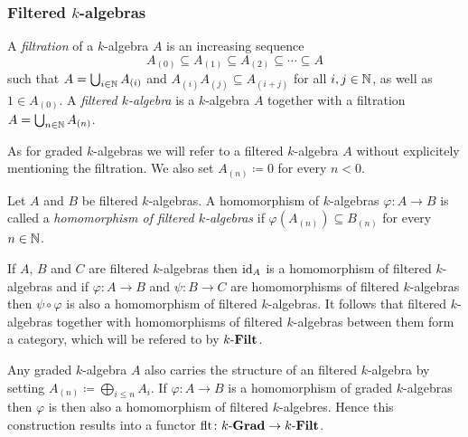 \subsubsection{Filtered $k$-algebras}


\begin{defi}
 A \emph{filtration} of a $k$-algebra $A$ is an increasing sequence
 \[
  A_{(0)}
  \subseteq A_{(1)}
  \subseteq A_{(2)}
  \subseteq \dotsb
  \subseteq A
 \]
 such that $A = \bigcup_{i \in \mathbb{N}} A_{(i)}$ and $A_{(i)} A_{(j)} \subseteq A_{(i+j)}$ for all $i,j \in \mathbb{N}$, as well as $1 \in A_{(0)}$. A \emph{filtered $k$-algebra} is a $k$-algebra $A$ together with a filtration $A = \bigcup_{n \in \mathbb{N}} A_{(n)}$.
\end{defi}


\begin{rem}
 As for graded $k$-algebras we will refer to a filtered $k$-algebra $A$ without explicitely mentioning the filtration. We also set $A_{(n)} \coloneqq 0$ for every $n < 0$.
\end{rem}


\begin{defi}
 Let $A$ and $B$ be filtered $k$-algebras. A homomorphism of $k$-algebras $\varphi \colon A \to B$ is called a \emph{homomorphism of filtered $k$-algebras} if $\varphi(A_{(n)}) \subseteq B_{(n)}$ for every $n \in \mathbb{N}$.
\end{defi}


\begin{rem}
 If $A$, $B$ and $C$ are filtered $k$-algebras then $\operatorname{id}_A$ is a homomorphism of filtered $k$-algebras and if $\varphi \colon A \to B$ and $\psi \colon B \to C$ are homomorphisms of filtered $k$-algebras then $\psi \circ \varphi$ is also a homomorphism of filtered $k$-algebras. It follows that filtered $k$-algebras together with homomorphisms of filtered $k$-algebras between them form a category, which will be refered to by $k\text{-}\mathbf{Filt}$.
\end{rem}


\begin{expl}
 Any graded $k$-algebra $A$ also carries the structure of an filtered $k$-algebra by setting $A_{(n)} \coloneqq \bigoplus_{i \leq n} A_i$. If $\varphi \colon A \to B$ is a homomorphism of graded $k$-algebras then $\varphi$ is then also a homomorphism of filtered $k$-algebres. Hence this construction results into a functor $\operatorname{flt} \colon k\text{-}\mathbf{Grad} \to k\text{-}\mathbf{Filt}$.
\end{expl}


